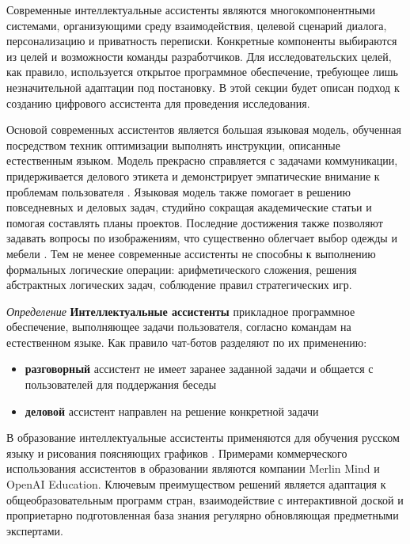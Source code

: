 Современные интеллектуальные ассистенты являются многокомпонентными системами, организующими
среду взаимодействия, целевой сценарий диалога, персонализацию и приватность переписки. Конкретные компоненты
выбираются из целей и возможности команды разработчиков. Для исследовательских целей, как правило, используется
открытое программное обеспечение, требующее лишь незначительной адаптации под постановку. В этой секции 
будет описан подход к созданию цифрового ассистента для проведения исследования. 

Основой современных ассистентов является большая языковая модель,
обученная посредством техник оптимизации выполнять инструкции, описанные естественным языком. 
Модель прекрасно справляется с задачами коммуникации, придерживается делового этикета и демонстрирует эмпатические
внимание к проблемам пользователя \cite{jiang2023mistral}\cite{llamatouvron2023}. Языковая модель
также помогает в решению повседневных и деловых задач, студийно сокращая академические статьи и помогая составлять
планы проектов. Последние достижения также позволяют задавать вопросы по изображениям, что существенно облегчает
выбор одежды и мебели \cite{bai2023qwen}. Тем не менее современные ассистенты не способны 
к выполнению формальных логические операции: арифметического сложения, решения абстрактных логических задач, соблюдение 
правил стратегических игр.


\textit{Определение} \textbf{Интеллектуальные ассистенты} прикладное программное обеспечение, выполняющее задачи пользователя, согласно командам на естественном языке. 
Как правило чат-ботов разделяют по их применению:
\begin{itemize}
    \item \textbf{разговорный} ассистент не имеет заранее заданной задачи и общается с пользователей для поддержания беседы
    \item \textbf{деловой} ассистент направлен на решение конкретной задачи
\end{itemize}

В образование интеллектуальные ассистенты применяются для обучения русском языку \cite{аль2019интеллектуальный} 
и рисования поясняющих графиков \cite{bulusuautomated}. Примерами коммерческого
использования ассистентов в образовании являются компании Merlin Mind
и OpenAI Education. Ключевым преимуществом решений является адаптация к общеобразовательным программ стран, 
взаимодействие с интерактивной доской и проприетарно подготовленная база знания регулярно обновляющая предметными экспертами.
